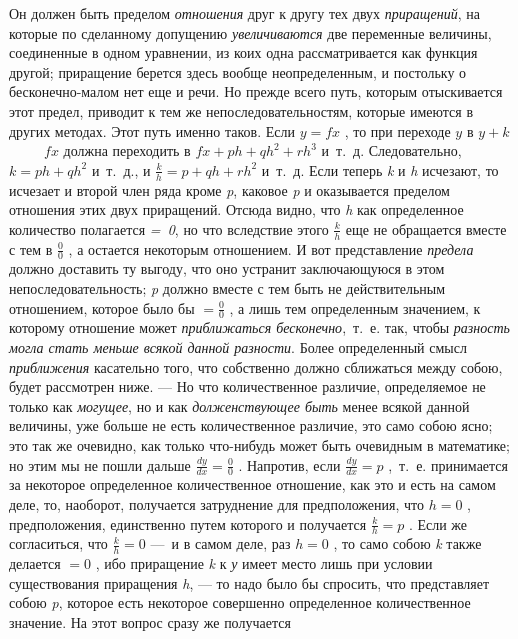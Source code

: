 Он должен быть пределом {\em отношения} друг к другу тех
двух {\em приращений}, на которые по сделанному
допущению {\em увеличиваются} две переменные величины,
соединенные в одном уравнении, из коих одна рассматривается как функция
другой; приращение берется здесь вообще неопределенным, и постольку о
бесконечно-малом нет еще и речи. Но прежде всего путь, которым отыскивается
этот предел, приводит к тем же непоследовательностям, которые имеются в
других методах. Этот путь именно таков. Если  $y=\mathit{fx}$ , то при
переходе  $y$ {\em  }в  $y+k$  \ \ \ \ \  $\mathit{fx}$
 должна переходить в  $\mathit{fx}+\mathit{ph}+qh^2+rh^3$  и~т.~д.
Следовательно,  $k=\mathit{ph}+qh^2$  и~т.~д., и  $\frac k
h=p+\mathit{qh}+rh^2$  и~т.~д. Если теперь {\em k} и
{\em h} исчезают, то исчезает и второй член ряда кроме
{\em p}, каковое {\em p} и
оказывается пределом отношения этих двух приращений. Отсюда видно, что
{\em h} как определенное количество полагается
{\em =~0}, но что вследствие
этого  $\frac k h$  еще не обращается вместе с тем в  $\frac 0 0$ , а
остается некоторым отношением. И вот представление
{\em предела} должно доставить ту выгоду, что оно
устранит заключающуюся в этом непоследовательность;
{\em p} должно вместе с тем быть не действительным
отношением, которое было бы  $=\frac 0 0$ , а лишь тем определенным
значением, к которому отношение может {\em приближаться
бесконечно},~т.~е. так, чтобы {\em разность могла стать
меньше всякой данной разности}. Более определенный смысл
{\em приближения} касательно того, что собственно
должно сближаться между собою, будет рассмотрен ниже. — Но что
количественное различие, определяемое не только как
{\em могущее}, но и как
{\em долженствующее быть} менее всякой данной величины,
уже больше не есть количественное различие, это само собою ясно; это так же
очевидно, как только что-нибудь может быть очевидным в математике; но этим
мы не пошли дальше  $\frac{\mathit{dy}}{\mathit{dx}}=\frac 0 0$ . Напротив,
если  $\frac{\mathit{dy}}{\mathit{dx}}=p$ ,~т.~е. принимается за некоторое
определенное количественное отношение, как это и есть на самом деле, то,
наоборот, получается затруднение для предположения, что  $h=0$ ,
предположения, единственно путем которого и получается  $\frac k h=p$ .
Если же согласиться, что $\frac k h=0$  —~и в самом деле, раз  $h=0$ , то
само собою {\em k} также делается  $=0$ , ибо
приращение {\em k} к {\em у} имеет
место лишь при условии существования приращения
{\em h}, — то надо было бы спросить, что представляет
собою {\em p}, которое есть некоторое совершенно
определенное количественное значение. На этот вопрос сразу же получается
